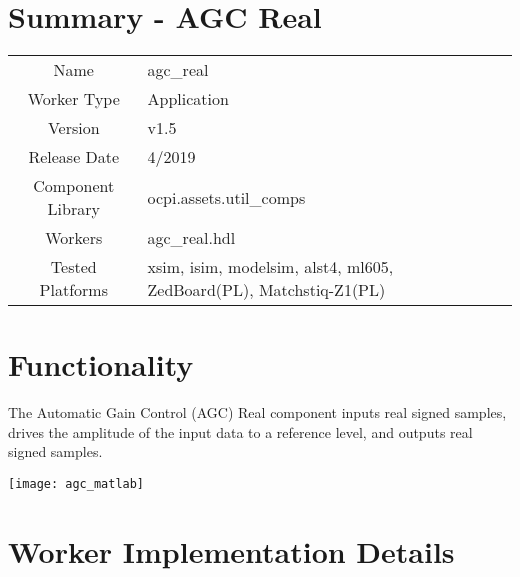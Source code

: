 \documentclass{article}
\author{} %
\date{Version \docVersion} %
\title{\docTitle}
\def\docVersion{1.5}
\def\comp{agc\_real}
\def\Comp{AGC Real}
\begin{document}
\section*{Summary - \Comp}

\begin{tabular}{|c|M{13.5cm}|}
	\hline
	                  &                                                              \\
	\hline
	Name              & \comp                                                        \\
	\hline
	Worker Type       & Application                                                  \\
	\hline
	Version           & v\docVersion \\
	\hline
	Release Date      & 4/2019 \\
	\hline
	Component Library & ocpi.assets.util\_comps                                        \\
	\hline
	Workers           & \comp.hdl                                                    \\
	\hline
	Tested Platforms  & xsim, isim, modelsim, alst4, ml605, ZedBoard(PL), Matchstiq-Z1(PL) \\
	\hline
\end{tabular}

\section*{Functionality}
\begin{flushleft}
	The Automatic Gain Control (AGC) Real component inputs real signed samples, drives the amplitude of the input data to a reference level, and outputs real signed samples.
\end{flushleft}

	{\centering\captionsetup{type=figure}\texttt{[image: agc\_matlab]}\par{}\label{fig:ideal}}

\section*{Worker Implementation Details}
\end{document}
